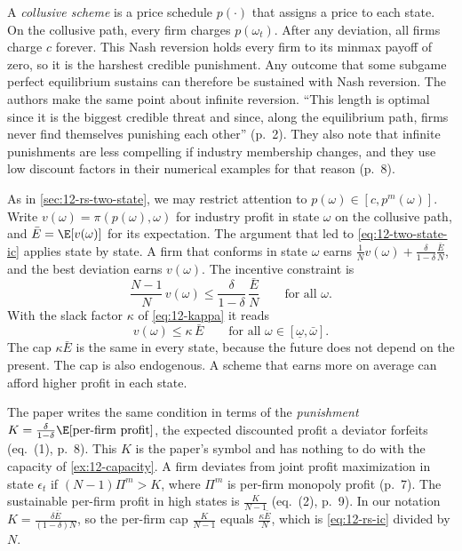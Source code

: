 A \emph{collusive scheme} is a price schedule $p(\cdot)$ that assigns a price to each state. On the collusive path,
every firm charges $p(\omega_t)$. After any deviation, all firms charge $c$ forever. This Nash reversion holds every
firm to its minmax payoff of zero, so it is the harshest credible punishment. Any outcome that some subgame perfect
equilibrium sustains can therefore be sustained with Nash reversion. The authors make the same point about infinite
reversion. ``This length is optimal since it is the biggest credible threat and since, along the equilibrium path,
firms never find themselves punishing each other'' (p.~2). They also note that infinite punishments are less compelling if
industry membership changes, and they use low discount factors in their numerical examples for that reason (p.~8).

As in \cref{sec:12-rs-two-state}, we may restrict attention to $p(\omega) \in [c, p^m(\omega)]$. Write
$v(\omega) = \pi(p(\omega), \omega)$ for industry profit in state $\omega$ on the collusive path, and
$\bar E = \E[v(\omega)]$ for its expectation. The argument that led to \eqref{eq:12-two-state-ic} applies state by
state. A firm that conforms in state $\omega$ earns $\frac{1}{N}v(\omega) + \frac{\delta}{1-\delta}\frac{\bar E}{N}$, and the best
deviation earns $v(\omega)$. The incentive constraint is
\begin{equation*}
\frac{N-1}{N}\, v(\omega) \le \frac{\delta}{1-\delta}\,\frac{\bar E}{N} \qquad \text{for all } \omega.
\end{equation*}
With the slack factor $\kappa$ of \eqref{eq:12-kappa} it reads
\begin{equation}\label{eq:12-rs-ic}
v(\omega) \le \kappa\, \bar E \qquad \text{for all } \omega \in [\underline\omega, \bar\omega].
\end{equation}
The cap $\kappa \bar E$ is the same in every state, because the future does not depend on the present. The cap is
also endogenous. A scheme that earns more on average can afford higher profit in each state.

The paper writes the same condition in terms of the \emph{punishment}
$K = \frac{\delta}{1-\delta}\E[\text{per-firm profit}]$, the expected discounted profit a deviator forfeits (eq.~(1), p.~8).
This $K$ is the paper's symbol and has nothing to do with the capacity of \cref{ex:12-capacity}. A
firm deviates from joint profit maximization in state $\epsilon_t$ if $(N-1)\Pi^m > K$, where $\Pi^m$ is per-firm
monopoly profit (p.~7). The sustainable per-firm profit in high states is $\frac{K}{N-1}$ (eq.~(2), p.~9). In our
notation $K = \frac{\delta \bar E}{(1-\delta)N}$, so the per-firm cap $\frac{K}{N-1}$ equals $\frac{\kappa\bar E}{N}$, which is
\eqref{eq:12-rs-ic} divided by $N$.

